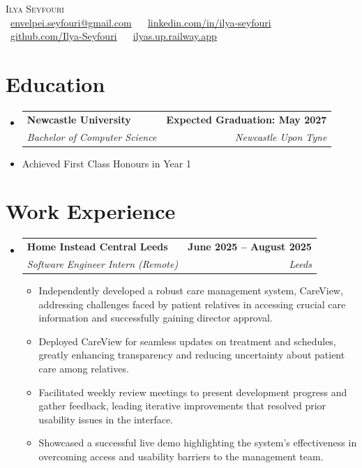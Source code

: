 \documentclass[letterpaper,11pt]{article}
\makeatletter
\newcommand{\resumeItem}[1]{
  \item\small{
    {#1 \vspace{0pt}}
  }
}
\newcommand{\resumeSubheading}[4]{
  \vspace{-2pt}\item
    \begin{tabular*}{1.0\textwidth}[t]{l@{\extracolsep{\fill}}r}
      \textbf{#1} & \textbf{\small #2} \\
      \textit{\small#3} & \textit{\small #4} \\
    \end{tabular*}\vspace{-7pt}
}
\newcommand{\resumeSubHeadingListStart}{\begin{itemize}[leftmargin=0.0in, label={}]}
\newcommand{\resumeSubHeadingListEnd}{\end{itemize}}\vspace{0pt}
\newcommand{\resumeItemListStart}{\begin{itemize}}
\newcommand{\resumeItemListEnd}{\end{itemize}\vspace{-5pt}}
\makeatother
\begin{document}
\begin{center}
    {\Large \scshape Ilya Seyfouri} \\[2mm]
    \footnotesize \raisebox{-0.1\height}
    \faPhone\ \underline{envelpei.seyfouri@gmail.com} ~ 
    {\faEnvelope\  \underline{linkedin.com/in/ilya-seyfouri}} ~ 
    {\faGithub\ \underline{\href{https://github.com/Ilya-Seyfouri}{github.com/Ilya-Seyfouri}}} ~
    {\faBriefcase\ \underline{\href{https://ilyas.up.railway.app}{ilyas.up.railway.app}}}
    \vspace{-8pt}
\end{center}

\section{Education}
  \resumeSubHeadingListStart
    \resumeSubheading
      {Newcastle University}{Expected Graduation: May 2027}
      {Bachelor of Computer Science}{Newcastle Upon Tyne}
  \resumeSubHeadingListEnd
    \resumeItemListStart
        \resumeItem {Achieved First Class Honours in Year 1}
        \vspace{-7pt}
    \resumeItemListEnd
    \vspace{-12pt}

\section{Work Experience}
    \resumeSubHeadingListStart
        \resumeSubheading{Home Instead Central Leeds}{June 2025 -- August 2025}{Software Engineer Intern (Remote)}{Leeds}
            \resumeItemListStart
                \resumeItem{Independently developed a robust care management system, CareView, addressing challenges faced by patient relatives in accessing crucial care information and successfully gaining director approval.}
                \resumeItem{Deployed CareView for seamless updates on treatment and schedules, greatly enhancing transparency and reducing uncertainty about patient care among relatives.}
                \resumeItem{Facilitated weekly review meetings to present development progress and gather feedback, leading iterative improvements that resolved prior usability issues in the interface.}
                \resumeItem{Showcased a successful live demo highlighting the system’s effectiveness in overcoming access and usability barriers to the management team.}
            \resumeItemListEnd
    \resumeSubHeadingListEnd
    \vspace{-12pt}
\end{document}
